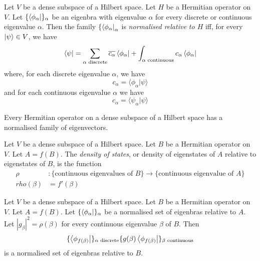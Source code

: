 
\begin{df}
Let $V$ be a dense subspace of a Hilbert space.
Let $H$ be a Hermitian operator on $V$. Let $\{ \left\langle {\phi_\alpha} \right| \}_\alpha$ be an eigenbra with eigenvalue $\alpha$ for every discrete or continuous eigenvalue $\alpha$. Then the family $\{ \left\langle {\phi_\alpha} \right|_\alpha$ is \emph{normalised relative to $H$} iff, for every $\left| {\psi} \right\rangle \in V$, we have
\[ \left\langle {\psi} \right| = \sum_{\alpha \text{ discrete}} \overline{c_\alpha} \left\langle {\phi_\alpha} \right| + \int_{\alpha \text{ continuous}} c_\alpha \left\langle {\phi_\alpha} \right| \]
where, for each discrete eigenvalue $\alpha$, we have
\[ c_\alpha = \langle \phi_\alpha | \psi \rangle \]
and for each continuous eigenvalue $\alpha$ we have
\[ c_\alpha = \langle \psi_\alpha | \psi \rangle \]
\end{df}

\begin{thm}
Every Hermitian operator on a dense subspace of a Hilbert space has a normalised family of eigenvectors.
\end{thm}

\begin{df}
Let $V$ be a dense subspace of a Hilbert space. Let $B$ be a Hermitian operator on $V$. Let $A = f(B)$. The \emph{density of states}, or density of eigenstates of $A$ relative to eigenstates of $B$, is the function
\begin{align*}
\rho & : \{ \text{continuous eigenvalues of } B \} \rightarrow \{ \text{continuous eigenvalue of } A \} \\rho(\beta) & = f'(\beta)
\end{align*}
\end{df}

\begin{thm}
Let $V$ be a dense subspace of a Hilbert space. Let $B$ be a Hermitian operator on $V$. Let $A = f(B)$. Let $\{ \left\langle {\phi_\alpha} \right| \}_\alpha$ be a normalised set of eigenbras relative to $A$. Let $|g_\beta|^2 = \rho(\beta)$ for every continuous eigenvalue $\beta$ of $B$. Then
\[ \{ \left\langle {\phi_{f(\beta)}} \right| \}_{\alpha \text{ discrete}}\{ g(\beta) \left\langle {\phi_{f(\beta)}} \right| \}_{\beta \text{ continuous}} \]
is a normalised set of eigenbras relative to $B$.
\end{thm}


